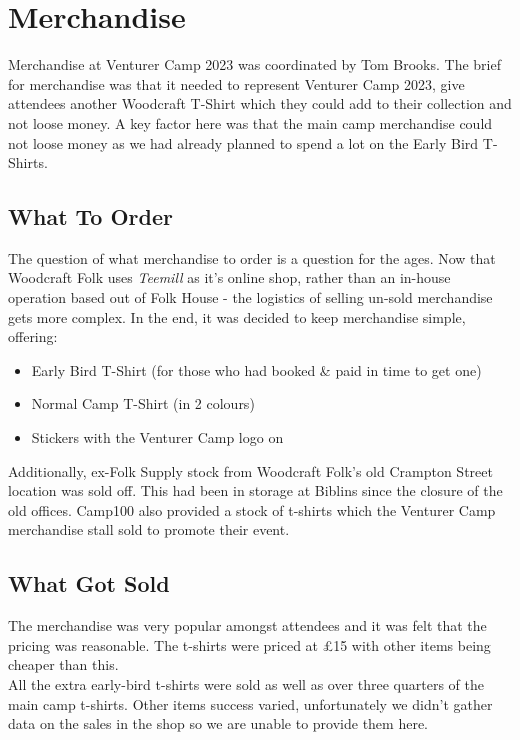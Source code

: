 \chapter{Merchandise}

Merchandise at Venturer Camp 2023 was coordinated by Tom Brooks. The brief for merchandise was that it needed to represent Venturer Camp 2023, give attendees another Woodcraft T-Shirt which they could add to their collection and not loose money. A key factor here was that the main camp merchandise could not loose money as we had already planned to spend a lot on the Early Bird T-Shirts.

\section{What To Order}
The question of what merchandise to order is a question for the ages. Now that Woodcraft Folk uses \textit{Teemill} as it's online shop, rather than an in-house operation based out of Folk House - the logistics of selling un-sold merchandise gets more complex. In the end, it was decided to keep merchandise simple, offering:
\begin{itemize}
    \item Early Bird T-Shirt (for those who had booked \& paid in time to get one)
    \item Normal Camp T-Shirt (in 2 colours)
    \item Stickers with the Venturer Camp logo on
\end{itemize}
Additionally, ex-Folk Supply stock from Woodcraft Folk's old Crampton Street location was sold off. This had been in storage at Biblins since the closure of the old offices. Camp100 also provided a stock of t-shirts which the Venturer Camp merchandise stall sold to promote their event.

\section{What Got Sold}
The merchandise was very popular amongst attendees and it was felt that the pricing was reasonable. The t-shirts were priced at \pounds15 with other items being cheaper than this. \\

All the extra early-bird t-shirts were sold as well as over three quarters of the main camp t-shirts. Other items success varied, unfortunately we didn't gather data on the sales in the shop so we are unable to provide them here. \\

